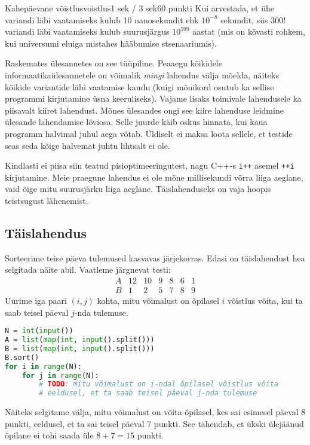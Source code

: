 \begin{yl}{4}{Kahepäevane võistlus}{voistlus}{1 sek / 3 sek}{60 punkti}
  Kui arvestada, et ühe variandi läbi vaatamiseks kulub 10 nanosekundit
  ehk $10^{-8}$ sekundit, siis $300!$ variandi läbi vaatamiseks kulub
  suurusjärgus $10^{599}$ aastat (mis on kõvasti rohkem, kui universumi
  eluiga mistahes hääbumise stsenaariumis).

  Raskemates ülesannetes on see tüüpiline. Peaaegu kõikidele informaatikaülesannetele
  on võimalik \emph{mingi} lahendus välja mõelda, näiteks kõikide variantide läbi
  vaatamise kaudu (kuigi mõnikord osutub ka sellise programmi kirjutamine üsna
  keeruliseks). Vajame lisaks toimivale lahendusele ka piisavalt kiiret lahendust.
  Mõnes ülesandes ongi see kiire lahenduse leidmine ülesande lahendamise lõviosa.
  Selle juurde käib oskus hinnata, kui kaua programm halvimal juhul aega võtab.
  Üldiselt ei maksa loota sellele, et testide seas seda kõige halvemat juhtu lihtsalt
  ei ole.

  Kindlasti ei piisa siin teatud pisioptimeeringutest, nagu C++-s \verb/i++/ asemel
  \verb/++i/ kirjutamine. Meie praegune lahendus ei ole mõne millisekundi võrra liiga
  aeglane, vaid õige mitu suurusjärku liiga aeglane. Täislahenduseks on vaja hoopis
  teistsugust lähenemist.

  \subsection*{Täislahendus}

  Sorteerime teise päeva tulemused kasvavas järjekorras.
  Edasi on täislahendust hea selgitada näite abil. Vaatleme järgnevat testi:
  \[
  \begin{array}{r|cccccc}
    A & 12 & 10 & 9 & 8 & 6 & 1 \\
    \hline
    B &  1 &  2 & 5 & 7 & 8 & 9
    \end{array}
  \]
  Uurime iga paari $(i, j)$ kohta, mitu võimalust on õpilasel $i$ võistlus
  võita, kui ta saab teisel päeval $j$-nda tulemuse.
  \begin{lstlisting}[language=Python]
N = int(input())
A = list(map(int, input().split()))
B = list(map(int, input().split()))
B.sort()
for i in range(N):
    for j in range(N):
        # TODO: mitu võimalust on i-ndal õpilasel võistlus võita
        # eeldusel, et ta saab teisel päeval j-nda tulemuse
  \end{lstlisting}
  Näiteks selgitame välja, mitu võimalust on võita õpilasel, kes sai esimesel
  päeval 8 punkti, eeldusel, et ta sai teisel päeval 7 punkti. See tähendab,
  et ükski ülejäänud õpilane ei tohi saada üle $8 + 7 = 15$ punkti.


\end{yl}
